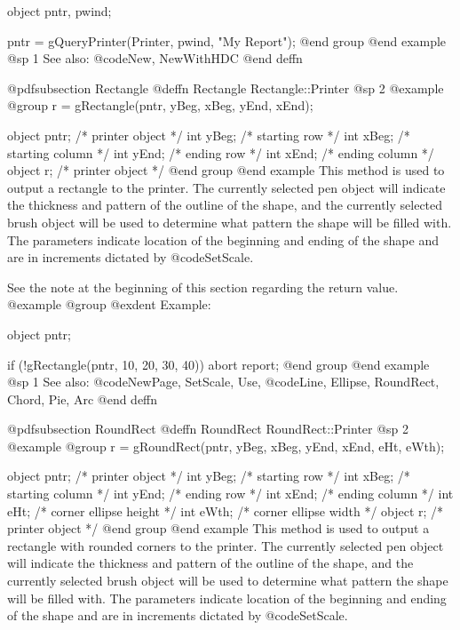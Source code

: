 object  pntr, pwind;

pntr = gQueryPrinter(Printer, pwind, "My Report");
@end group
@end example
@sp 1
See also:  @code{New, NewWithHDC}
@end deffn
















@pdfsubsection {Rectangle}
@deffn {Rectangle} Rectangle::Printer
@sp 2
@example
@group
r = gRectangle(pntr, yBeg, xBeg, yEnd, xEnd);

object  pntr;   /*  printer object   */
int     yBeg;   /*  starting row     */
int     xBeg;   /*  starting column  */
int     yEnd;   /*  ending row       */
int     xEnd;   /*  ending column    */
object  r;      /*  printer object   */
@end group
@end example
This method is used to output a rectangle to the printer.  The currently
selected pen object will indicate the thickness and pattern of the outline
of the shape, and the currently selected brush object will be used to determine
what pattern the shape will be filled with.
The parameters indicate location of the beginning and ending of the shape
and are in increments dictated by @code{SetScale}.

See the note at the beginning of this section regarding the return value.
@example
@group
@exdent Example:

object  pntr;

if (!gRectangle(pntr, 10, 20, 30, 40))
        abort report;
@end group
@end example
@sp 1
See also:  @code{NewPage, SetScale, Use,}
        @code{Line, Ellipse, RoundRect, Chord, Pie, Arc}
@end deffn















@pdfsubsection {RoundRect}
@deffn {RoundRect} RoundRect::Printer
@sp 2
@example
@group
r = gRoundRect(pntr, yBeg, xBeg, yEnd, xEnd, eHt, eWth);

object  pntr;   /*  printer object         */
int     yBeg;   /*  starting row           */
int     xBeg;   /*  starting column        */
int     yEnd;   /*  ending row             */
int     xEnd;   /*  ending column          */
int     eHt;    /*  corner ellipse height  */
int     eWth;   /*  corner ellipse width   */
object  r;      /*  printer object         */
@end group
@end example
This method is used to output a rectangle with rounded corners to the
printer.  The currently selected pen object will indicate the thickness
and pattern of the outline of the shape, and the currently selected
brush object will be used to determine what pattern the shape will be
filled with.  The parameters indicate location of the beginning and
ending of the shape and are in increments dictated by @code{SetScale}.

